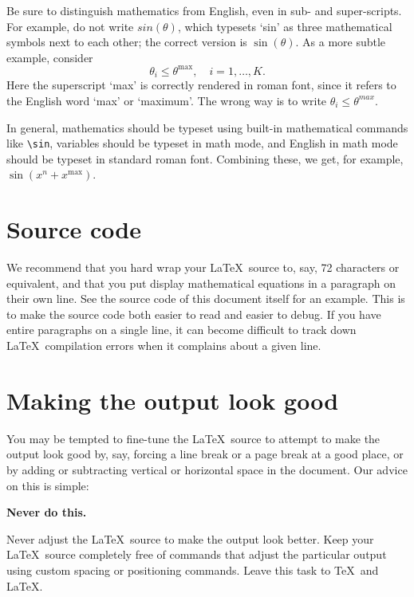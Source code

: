 \documentclass[openany]{now} %
\begin{document}
Be sure to distinguish mathematics from English, even in sub- and super-scripts.
For example, do not write $sin(\theta)$, which typesets `sin' as
three mathematical symbols next to each other; the correct version is $\sin(\theta)$.
As a more subtle example, consider 
\[
\theta_i \leq \theta^\mathrm{max}, \quad i=1, \ldots, K.
\]
Here the superscript `max' is correctly rendered in roman font, since it refers
to the English word `max' or `maximum'.  The wrong way is to write $\theta_i
\leq \theta^{max}$. 

In general, mathematics should be typeset using built-in mathematical commands like
\texttt{\textbackslash sin}, variables should be typeset in math mode, and
English in math mode should be typeset in standard roman font.  Combining
these, we get, for example, $\sin(x^n + x^\mathrm{max})$.

\section{Source code}
\label{s-formatting-source}

We recommend that you hard wrap your \LaTeX\ source to, say, 72 characters or
equivalent, and that you put display mathematical equations in a paragraph on their
own line. See the source code of this document itself for an example.
This is to make the source code both easier to read and easier to debug. 
If you have entire paragraphs on a single line, it can become difficult
to track down \LaTeX\ compilation errors when it complains about a given line.

\section{Making the output look good}
\label{s-never-do-this}

You may be tempted to fine-tune the \LaTeX\ source to attempt to make the 
output look good
by, say, forcing a line break or a page break at a good place, or by adding 
or subtracting vertical or horizontal space in the document.
Our advice on this is simple:

\begin{center}
\textbf{Never do this.}
\end{center}

Never adjust the \LaTeX\ source to make the output look better.
Keep your \LaTeX\ source completely free of commands that adjust the 
particular output using custom spacing or positioning commands.
Leave this task to \TeX\ and \LaTeX.
\end{document}
